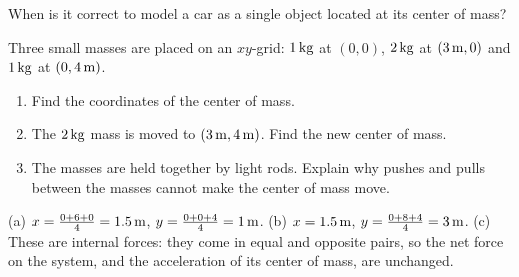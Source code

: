 \begin{exo}{}
When is it correct to model a car as a single object located at its center of mass?
\end{exo}
\begin{exo}{}
Three small masses are placed on an $xy$-grid: $1\,\mathrm{kg}$ at $(0,0)$, $2\,\mathrm{kg}$ at $(3\,\mathrm{m},0)$ and $1\,\mathrm{kg}$ at $(0,4\,\mathrm{m})$.
\begin{enumerate}[label=(\alph*)]
\item Find the coordinates of the center of mass.
\item The $2\,\mathrm{kg}$ mass is moved to $(3\,\mathrm{m},4\,\mathrm{m})$. Find the new center of mass.
\item The masses are held together by light rods. Explain why pushes and pulls between the masses cannot make the center of mass move.
\end{enumerate}
\work{4.5cm}
\begin{solution}
(a) $x=\frac{0+6+0}{4}=1.5\,\mathrm{m}$, $y=\frac{0+0+4}{4}=1\,\mathrm{m}$. \;(b) $x=1.5\,\mathrm{m}$, $y=\frac{0+8+4}{4}=3\,\mathrm{m}$. \;(c) These are internal forces: they come in equal and opposite pairs, so the net force on the system, and the acceleration of its center of mass, are unchanged.
\end{solution}
\end{exo}

